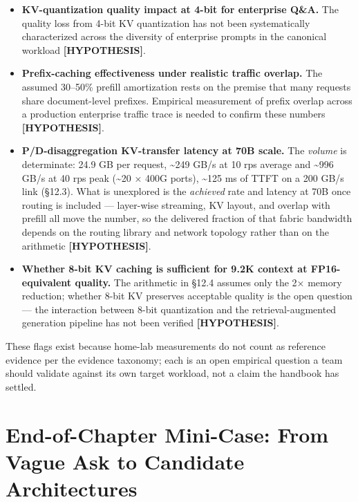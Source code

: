 \begin{itemize}
\item
  \textbf{KV-quantization quality impact at 4-bit for enterprise Q\&A.}
  The quality loss from 4-bit KV quantization has not been
  systematically characterized across the diversity of enterprise
  prompts in the canonical workload \textbf{\mbox{{[}HYPOTHESIS{]}}}.
\item
  \textbf{Prefix-caching effectiveness under realistic traffic overlap.}
  The assumed 30--50\% prefill amortization rests on the premise that
  many requests share document-level prefixes. Empirical measurement of
  prefix overlap across a production enterprise traffic trace is needed
  to confirm these numbers \textbf{\mbox{{[}HYPOTHESIS{]}}}.
\item
  \textbf{P/D-disaggregation KV-transfer latency at 70B scale.} The
  \emph{volume} is determinate: 24.9 GB per request, \textasciitilde249
  GB/s at 10 rps average and \textasciitilde996 GB/s at 40 rps peak
  (\textasciitilde20 × 400G ports), \textasciitilde125 ms of TTFT on a
  200 GB/s link (§12.3). What is unexplored is the \emph{achieved} rate
  and latency at 70B once routing is included --- layer-wise streaming,
  KV layout, and overlap with prefill all move the number, so the
  delivered fraction of that fabric bandwidth depends on the routing
  library and network topology rather than on the arithmetic
  \textbf{\mbox{{[}HYPOTHESIS{]}}}.
\item
  \textbf{Whether 8-bit KV caching is sufficient for 9.2K context at
  FP16-equivalent quality.} The arithmetic in §12.4 assumes only the 2×
  memory reduction; whether 8-bit KV preserves acceptable quality is the
  open question --- the interaction between 8-bit quantization and the
  retrieval-augmented generation pipeline has not been verified
  \textbf{\mbox{{[}HYPOTHESIS{]}}}.
\end{itemize}

These flags exist because home-lab measurements do not count as
reference evidence per the evidence taxonomy; each is an open empirical
question a team should validate against its own target workload, not a
claim the handbook has settled.

\section{End-of-Chapter Mini-Case: From Vague Ask to Candidate
Architectures}\label{end-of-chapter-mini-case-from-vague-ask-to-candidate-architectures}

